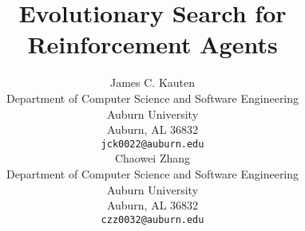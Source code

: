 \title{Evolutionary Search for Reinforcement Agents}

\author{
	James C. Kauten \\
	Department of Computer Science and Software Engineering \\
	Auburn University \\
	Auburn, AL 36832 \\
	\texttt{jck0022@auburn.edu} \\
	\And
	Chaowei Zhang \\
	Department of Computer Science and Software Engineering \\
	Auburn University \\
	Auburn, AL 36832 \\
	\texttt{czz0032@auburn.edu} \\
}

\maketitle
